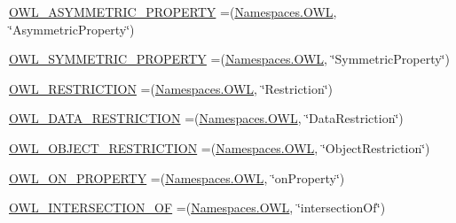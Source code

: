\begin{DoxyCompactItemize}
\item 
\hyperlink{enumorg_1_1semanticweb_1_1owlapi_1_1vocab_1_1_o_w_l_r_d_f_vocabulary_aae01d64ae0415d3d32790aee68956d72}{O\-W\-L\-\_\-\-A\-S\-Y\-M\-M\-E\-T\-R\-I\-C\-\_\-\-P\-R\-O\-P\-E\-R\-T\-Y} =(\hyperlink{enumorg_1_1semanticweb_1_1owlapi_1_1vocab_1_1_namespaces_a2fcb537074d9307ef1356ffb6a5bd6f4}{Namespaces.\-O\-W\-L}, \char`\"{}Asymmetric\-Property\char`\"{})
\item 
\hyperlink{enumorg_1_1semanticweb_1_1owlapi_1_1vocab_1_1_o_w_l_r_d_f_vocabulary_ae9e194cad8658cb4684da9d6aeb339d0}{O\-W\-L\-\_\-\-S\-Y\-M\-M\-E\-T\-R\-I\-C\-\_\-\-P\-R\-O\-P\-E\-R\-T\-Y} =(\hyperlink{enumorg_1_1semanticweb_1_1owlapi_1_1vocab_1_1_namespaces_a2fcb537074d9307ef1356ffb6a5bd6f4}{Namespaces.\-O\-W\-L}, \char`\"{}Symmetric\-Property\char`\"{})
\item 
\hyperlink{enumorg_1_1semanticweb_1_1owlapi_1_1vocab_1_1_o_w_l_r_d_f_vocabulary_a0f869276b427669e8351a42b98c3ebda}{O\-W\-L\-\_\-\-R\-E\-S\-T\-R\-I\-C\-T\-I\-O\-N} =(\hyperlink{enumorg_1_1semanticweb_1_1owlapi_1_1vocab_1_1_namespaces_a2fcb537074d9307ef1356ffb6a5bd6f4}{Namespaces.\-O\-W\-L}, \char`\"{}Restriction\char`\"{})
\item 
\hyperlink{enumorg_1_1semanticweb_1_1owlapi_1_1vocab_1_1_o_w_l_r_d_f_vocabulary_abaa38eea71b5e94e2095e19dd49d68c8}{O\-W\-L\-\_\-\-D\-A\-T\-A\-\_\-\-R\-E\-S\-T\-R\-I\-C\-T\-I\-O\-N} =(\hyperlink{enumorg_1_1semanticweb_1_1owlapi_1_1vocab_1_1_namespaces_a2fcb537074d9307ef1356ffb6a5bd6f4}{Namespaces.\-O\-W\-L}, \char`\"{}Data\-Restriction\char`\"{})
\item 
\hyperlink{enumorg_1_1semanticweb_1_1owlapi_1_1vocab_1_1_o_w_l_r_d_f_vocabulary_a5bb9fd829b08a93670d9118d1ca77c97}{O\-W\-L\-\_\-\-O\-B\-J\-E\-C\-T\-\_\-\-R\-E\-S\-T\-R\-I\-C\-T\-I\-O\-N} =(\hyperlink{enumorg_1_1semanticweb_1_1owlapi_1_1vocab_1_1_namespaces_a2fcb537074d9307ef1356ffb6a5bd6f4}{Namespaces.\-O\-W\-L}, \char`\"{}Object\-Restriction\char`\"{})
\item 
\hyperlink{enumorg_1_1semanticweb_1_1owlapi_1_1vocab_1_1_o_w_l_r_d_f_vocabulary_abaecc99815cbd9011b8d522b2599ecb6}{O\-W\-L\-\_\-\-O\-N\-\_\-\-P\-R\-O\-P\-E\-R\-T\-Y} =(\hyperlink{enumorg_1_1semanticweb_1_1owlapi_1_1vocab_1_1_namespaces_a2fcb537074d9307ef1356ffb6a5bd6f4}{Namespaces.\-O\-W\-L}, \char`\"{}on\-Property\char`\"{})
\item 
\hyperlink{enumorg_1_1semanticweb_1_1owlapi_1_1vocab_1_1_o_w_l_r_d_f_vocabulary_af3c18b20e119d9647b60cf2f5f7b5736}{O\-W\-L\-\_\-\-I\-N\-T\-E\-R\-S\-E\-C\-T\-I\-O\-N\-\_\-\-O\-F} =(\hyperlink{enumorg_1_1semanticweb_1_1owlapi_1_1vocab_1_1_namespaces_a2fcb537074d9307ef1356ffb6a5bd6f4}{Namespaces.\-O\-W\-L}, \char`\"{}intersection\-Of\char`\"{})

\end{DoxyCompactItemize}
